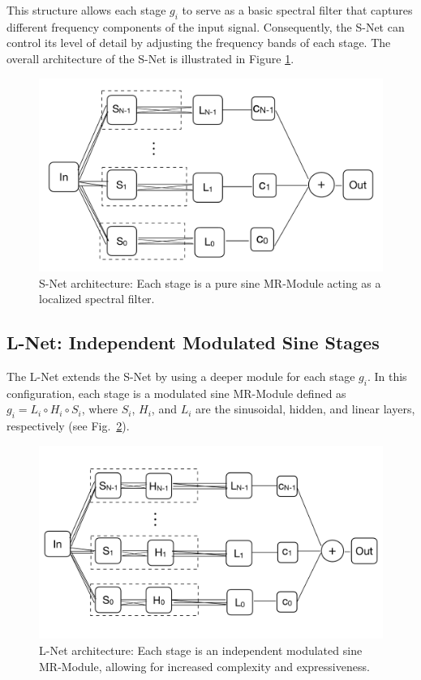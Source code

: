 This structure allows each stage \( g_i \) to serve as a basic spectral filter that captures different frequency components of the input signal. Consequently, the S-Net can control its level of detail by adjusting the frequency bands of each stage. The overall architecture of the S-Net is illustrated in Figure \ref{f:s-net}.

\begin{figure}[!h]
\centering
\includegraphics[width=0.58\linewidth]{img/ch4/snet.pdf}
\caption{S-Net architecture: Each stage is a pure sine MR-Module acting as a localized spectral filter.}
\label{f:s-net}
\end{figure}

\subsection{L-Net: Independent Modulated Sine Stages}
\label{s-lnet}

The L-Net extends the S-Net by using a deeper module for each stage \( g_i \). In this configuration, each stage is a modulated sine MR-Module defined as \( g_i = L_i \circ H_i \circ S_i \), where \( S_i \), \( H_i \), and \( L_i \) are the sinusoidal, hidden, and linear layers, respectively (see Fig.~\ref{f:l-net}).

\begin{figure}[!h]
    \centering
    \includegraphics[width=0.7\linewidth]{img/ch4/lnet.pdf}
    \caption{L-Net architecture: Each stage is an independent modulated sine MR-Module, allowing for increased complexity and expressiveness.}
    \label{f:l-net}
\end{figure}

